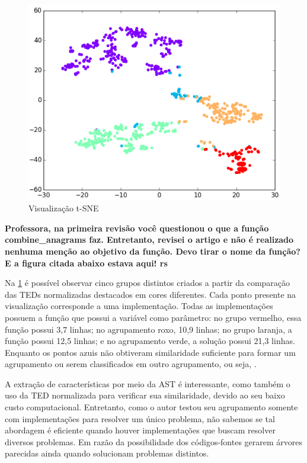 	    \begin{figure}[ht]
	        \centering
	        \includegraphics[scale=0.5]{imagem/visualizacao-tSNE.png}
	        \captionsetup{justification=centering}
	        \caption{Visualização t-SNE \cite{Yin:2015}}
	        \label{fig:t-SNE}
	    \end{figure}
	    
	    \textbf{Professora, na primeira revisão você questionou o que a função
	    	combine\_anagrams faz. Entretanto, revisei o artigo e não é realizado
	    	nenhuma menção ao objetivo da função. Devo tirar o nome da função? E
	    	a figura citada abaixo estava aqui! rs}
	    
	    Na \cref{fig:t-SNE} é possível observar cinco grupos distintos
	    criados a partir da comparação das TEDs normalizadas destacados em cores
	    diferentes. Cada ponto presente na visualização corresponde a uma
	    implementação. Todas as implementações possuem a função 
	    que possui a variável  como parâmetro: no grupo vermelho,
	    essa função possui 3,7 linhas; no agrupamento roxo, 10,9 linhas; no
	    grupo laranja, a função possui 12,5 linhas; e no agrupamento verde,
	    a solução possui 21,3 linhas. Enquanto os pontos azuis não obtiveram
	    similaridade suficiente para formar um agrupamento ou serem classificados
	    em outro agrupamento, ou seja, . 

		A extração de características por meio da AST é interessante, como também
		o uso da TED normalizada para verificar sua similaridade, devido ao seu
		baixo custo computacional. Entretanto, como o autor testou seu agrupamento
		somente com implementações para resolver um único problema, não sabemos se
		tal abordagem é eficiente quando houver implementações que buscam resolver
		diversos problemas. Em razão da possibilidade dos códigos-fontes gerarem
		árvores parecidas ainda quando solucionam problemas distintos.
	    
